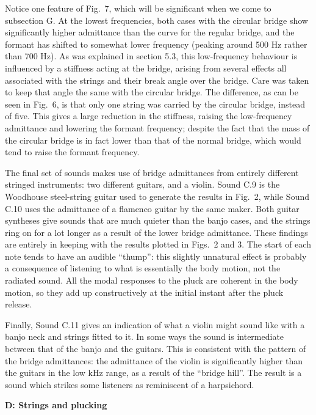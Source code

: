   Notice one feature of Fig.\ 7, which will be significant when we come to 
  subsection G. At the lowest frequencies, both cases with the circular bridge 
  show significantly higher admittance than the curve for the regular bridge, 
  and the formant has shifted to somewhat lower frequency (peaking around 500 
  Hz rather than 700 Hz). As was explained in section 5.3, this low-frequency 
  behaviour is influenced by a stiffness acting at the bridge, arising from 
  several effects all associated with the strings and their break angle over 
  the bridge. Care was taken to keep that angle the same with the circular 
  bridge. The difference, as can be seen in Fig.\ 6, is that only one string 
  was carried by the circular bridge, instead of five. This gives a large 
  reduction in the stiffness, raising the low-frequency admittance and lowering 
  the formant frequency; despite the fact that the mass of the circular bridge 
  is in fact lower than that of the normal bridge, which would tend to raise 
  the formant frequency. 

  The final set of sounds makes use of bridge admittances from entirely 
  different stringed instruments: two different guitars, and a violin. Sound 
  C.9 is the Woodhouse steel-string guitar used to generate the results in 
  Fig.\ 2, while Sound C.10 uses the admittance of a flamenco guitar by the 
  same maker. Both guitar syntheses give sounds that are much quieter than the 
  banjo cases, and the strings ring on for a lot longer as a result of the 
  lower bridge admittance. These findings are entirely in keeping with the 
  results plotted in Figs.\ 2 and 3. The start of each note tends to have an 
  audible ``thump'': this slightly unnatural effect is probably a consequence 
  of listening to what is essentially the body motion, not the radiated sound. 
  All the modal responses to the pluck are coherent in the body motion, so they 
  add up constructively at the initial instant after the pluck release. 

  Finally, Sound C.11 gives an indication of what a violin might sound like 
  with a banjo neck and strings fitted to it. In some ways the sound is 
  intermediate between that of the banjo and the guitars. This is consistent 
  with the pattern of the bridge admittances: the admittance of the violin is 
  significantly higher than the guitars in the low kHz range, as a result of 
  the ``bridge hill''. The result is a sound which strikes some listeners as 
  reminiscent of a harpsichord. 

  \textbf{D: Strings and plucking} 

